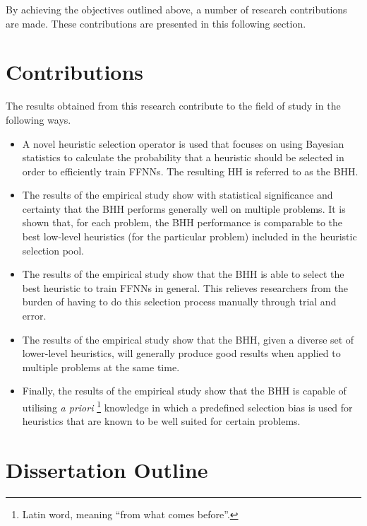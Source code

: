 \noindent
By achieving the objectives outlined above, a number of research contributions are made. These contributions are presented in this following section.


\section{Contributions}\label{sec:introduction:contributions}

The results obtained from this research contribute to the field of study in the
following ways.

\begin{itemize}
      \item A novel heuristic selection operator is used that focuses on using Bayesian statistics to calculate the probability that a heuristic should be selected in order to efficiently train \acp{FFNN}. The resulting \acs{HH} is referred to as the \acf{BHH}.

      \item The results of the empirical study show with statistical significance and certainty that the \Acs{BHH} performs generally well on multiple problems. It is shown that, for each problem, the \Acs{BHH} performance is comparable to the best low-level heuristics (for the particular problem) included in the heuristic selection pool.

      \item The results of the empirical study show that the \Acs{BHH} is able to select the best heuristic to train \acp{FFNN} in general. This relieves researchers from the burden of having to do this selection process manually through trial and error.

      \item The results of the empirical study show that the \Acs{BHH}, given a diverse set of lower-level heuristics, will generally produce good results when applied to multiple problems at the same time.

      \item Finally, the results of the empirical study show that the \Acs{BHH} is capable of utilising \textit{a priori} \footnote{Latin word, meaning ``from what comes before''.} knowledge in which a predefined selection bias is used for heuristics that are known to be well suited for certain problems.
\end{itemize}


\section{Dissertation Outline}\label{sec:introduction:outline}

